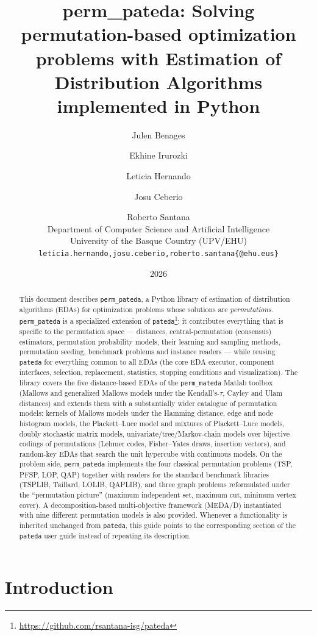 \documentclass[a4paper,11pt]{article}
\title{%
  \textbf{perm\_pateda: Solving permutation-based optimization problems with
  Estimation of Distribution Algorithms implemented in Python}\\[0.5em]
}
\author{
  Julen Benages \and Ekhine Irurozki \and Leticia Hernando \and Josu Ceberio \and Roberto Santana\\
  Department of Computer Science and Artificial Intelligence\\
  University of the Basque Country (UPV/EHU)\\
  \texttt{leticia.hernando,josu.ceberio,roberto.santana\{@ehu.eus\}}
}
\date{2026}
\begin{document}
\maketitle

\begin{abstract}
This document describes \texttt{perm\_pateda}, a Python library of estimation of
distribution algorithms (EDAs) for optimization problems whose solutions are
\emph{permutations}. \texttt{perm\_pateda} is a specialized extension of
\texttt{pateda}\footnote{\url{https://github.com/rsantana-isg/pateda}}: it contributes everything that is specific to the
permutation space --- distances, central-permutation (consensus) estimators,
permutation probability models, their learning and sampling methods, permutation
seeding, benchmark problems and instance readers --- while reusing
\texttt{pateda} for everything common to all EDAs (the core EDA executor,
component interfaces, selection, replacement, statistics, stopping conditions and
visualization).  The library covers the five distance-based EDAs of the
\texttt{perm\_mateda} Matlab toolbox (Mallows and
generalized Mallows models under the Kendall's-$\tau$, Cayley and Ulam
distances) and extends them with a substantially wider catalogue of permutation
models: kernels of Mallows models under the Hamming distance, edge and node
histogram models, the Plackett--Luce model and mixtures of Plackett--Luce models,
doubly stochastic matrix models, univariate/tree/Markov-chain models over
bijective codings of permutations (Lehmer codes, Fisher--Yates draws, insertion
vectors), and random-key EDAs that search the unit hypercube with continuous
models. On the problem side, \texttt{perm\_pateda} implements the four classical
permutation problems (TSP, PFSP, LOP, QAP) together with readers for the standard
benchmark libraries (TSPLIB, Taillard, LOLIB, QAPLIB), and three graph problems
reformulated under the ``permutation picture'' (maximum independent set, maximum
cut, minimum vertex cover).  A decomposition-based multi-objective framework
(MEDA/D) instantiated with nine different permutation models is also provided.
Whenever a functionality is inherited unchanged from \texttt{pateda}, this guide
points to the corresponding section of the \texttt{pateda} user guide instead of
repeating its description.
\end{abstract}

\tableofcontents
\newpage

\section{Introduction}
\label{sec:intro}
\end{document}
